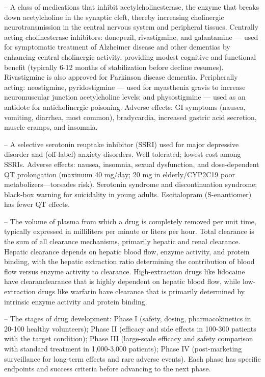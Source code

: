 -- A class of medications that inhibit acetylcholinesterase, the enzyme that breaks down acetylcholine in the synaptic cleft, thereby increasing cholinergic neurotransmission in the central nervous system and peripheral tissues. Centrally acting cholinesterase inhibitors: donepezil, rivastigmine, and galantamine — used for symptomatic treatment of Alzheimer disease and other dementias by enhancing central cholinergic activity, providing modest cognitive and functional benefit (typically 6-12 months of stabilization before decline resumes). Rivastigmine is also approved for Parkinson disease dementia. Peripherally acting: neostigmine, pyridostigmine — used for myasthenia gravis to increase neuromuscular junction acetylcholine levels; and physostigmine — used as an antidote for anticholinergic poisoning. Adverse effects: GI symptoms (nausea, vomiting, diarrhea, most common), bradycardia, increased gastric acid secretion, muscle cramps, and insomnia.

-- A selective serotonin reuptake inhibitor (SSRI) used for major depressive disorder and (off-label) anxiety disorders. Well tolerated; lowest cost among SSRIs. Adverse effects: nausea, insomnia, sexual dysfunction, and dose-dependent QT prolongation (maximum 40 mg/day; 20 mg in elderly/CYP2C19 poor metabolizers—torsades risk). Serotonin syndrome and discontinuation syndrome; black-box warning for suicidality in young adults. Escitalopram (S-enantiomer) has fewer QT effects.

-- The volume of plasma from which a drug is completely removed per unit time, typically expressed in milliliters per minute or liters per hour. Total clearance is the sum of all clearance mechanisms, primarily hepatic and renal clearance. Hepatic clearance depends on hepatic blood flow, enzyme activity, and protein binding, with the hepatic extraction ratio determining the contribution of blood flow versus enzyme activity to clearance. High-extraction drugs like lidocaine have clearanclearance that is highly dependent on hepatic blood flow, while low-extraction drugs like warfarin have clearance that is primarily determined by intrinsic enzyme activity and protein binding.

-- The stages of drug development: Phase I (safety, dosing, pharmacokinetics in 20-100 healthy volunteers); Phase II (efficacy and side effects in 100-300 patients with the target condition); Phase III (large-scale efficacy and safety comparison with standard treatment in 1,000-3,000 patients); Phase IV (post-marketing surveillance for long-term effects and rare adverse events). Each phase has specific endpoints and success criteria before advancing to the next phase.

